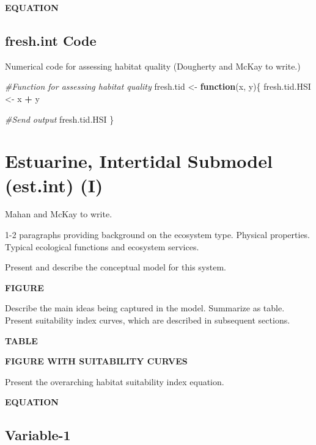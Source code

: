 \documentclass[
]{book}
\newenvironment{Shaded}{\begin{snugshade}}{\end{snugshade}}
\newcommand{\CommentTok}[1]{\textcolor[rgb]{0.56,0.35,0.01}{\textit{#1}}}
\newcommand{\ControlFlowTok}[1]{\textcolor[rgb]{0.13,0.29,0.53}{\textbf{#1}}}
\newcommand{\NormalTok}[1]{#1}
\newcommand{\OperatorTok}[1]{\textcolor[rgb]{0.81,0.36,0.00}{\textbf{#1}}}
\newcommand{\StringTok}[1]{\textcolor[rgb]{0.31,0.60,0.02}{#1}}
\begin{document}
\textbf{EQUATION}

\hypertarget{fresh.int-code}{%
\subsection{fresh.int Code}\label{fresh.int-code}}

Numerical code for assessing habitat quality ({Dougherty and McKay to write.})

\begin{Shaded}
\begin{Highlighting}[]
\CommentTok{#Function for assessing habitat quality}
\NormalTok{fresh.tid <-}\StringTok{ }\ControlFlowTok{function}\NormalTok{(x, y)\{}
\NormalTok{  fresh.tid.HSI <-}\StringTok{ }\NormalTok{x }\OperatorTok{+}\StringTok{ }\NormalTok{y}

  \CommentTok{#Send output}
\NormalTok{  fresh.tid.HSI}
\NormalTok{\}}
\end{Highlighting}
\end{Shaded}

\hypertarget{estuarine-intertidal-submodel-est.int-i}{%
\section{Estuarine, Intertidal Submodel (est.int) (I)}\label{estuarine-intertidal-submodel-est.int-i}}

{Mahan and McKay to write.}

1-2 paragraphs providing background on the ecosystem type. Physical properties. Typical ecological functions and ecosystem services.

Present and describe the conceptual model for this system.

\textbf{FIGURE}

Describe the main ideas being captured in the model. Summarize as table. Present suitability index curves, which are described in subsequent sections.

\textbf{TABLE}

\textbf{FIGURE WITH SUITABILITY CURVES}

Present the overarching habitat suitability index equation.

\textbf{EQUATION}

\hypertarget{variable-1-2}{%
\subsection{Variable-1}\label{variable-1-2}}
\end{document}
